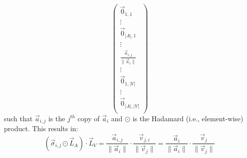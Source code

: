 \begin{enumerate}
\begin{equation*}
\begin{pmatrix}
                    \vec{0}_{1, 1}\\ 
                    \vdots\\ 
                    \vec{0}_{|A|, 1}\\ 
                   \vdots\\
                   \frac{\vec{a}_{i, j}}{\lVert \vec{a}_i \rVert}\\ 
                   \vdots\\
                   \vec{0}_{1, |V|}\\ 
                   \vdots\\ 
                   \vec{0}_{|A|, |V|}\\ 
                   \end{pmatrix}
    \end{equation*}
    such that $\vec{a}_{i, j}$ is the $j^{th}$ copy of $\vec{a}_i$ and $\odot$ is the Hadamard (i.e., element-wise) product.
    This results in:
    \begin{equation*}
        (\vec{\sigma}_{i, j} \odot \vec{L}_{A}) \cdot \vec{L}_V = \frac{\vec{a}_{i, j}}{\lVert \vec{a}_i \rVert} \cdot \frac{\vec{v}_{j, i}}{\lVert \vec{v}_j \rVert} = \frac{\vec{a}_{i}}{\lVert \vec{a}_i \rVert} \cdot \frac{\vec{v}_{j}}{\lVert \vec{v}_j \rVert}
    \end{equation*}
    

\end{enumerate}
